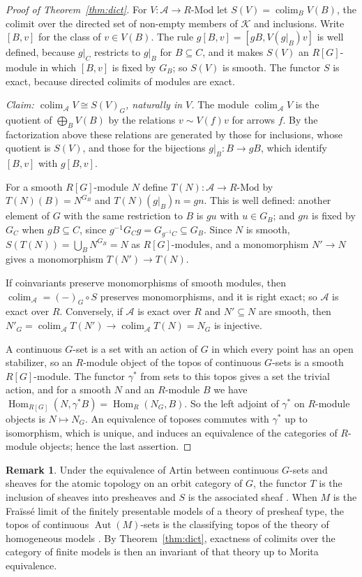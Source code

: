 \documentclass[11pt,a4paper]{article}
\theoremstyle{definition}
\newtheorem{remark}[theorem]{Remark}
\newcommand{\A}{\mathcal{A}}
\newcommand{\K}{\mathcal{K}}
\newcommand{\colim}{\operatorname{colim}}
\newcommand{\Aut}{\operatorname{Aut}}
\newcommand{\Hom}{\operatorname{Hom}}
\begin{document}
\begin{proof}[Proof of Theorem~\ref{thm:dict}]
For $V\colon\A\to R\text{-Mod}$ let $S(V)=\colim_{B}V(B)$, the colimit over
the directed set of non-empty members of $\K$ and inclusions. Write $[B,v]$
for the class of $v\in V(B)$. The rule $g[B,v]=[gB,V(g|_B)v]$ is well defined,
because $g|_C$ restricts to $g|_B$ for $B\subseteq C$, and it makes $S(V)$ an
$R[G]$-module in which $[B,v]$ is fixed by $G_B$; so $S(V)$ is smooth. The
functor $S$ is exact, because directed colimits of modules are exact.

\emph{Claim: $\colim_{\A}V\cong S(V)_G$, naturally in $V$.} The module
$\colim_{\A}V$ is the quotient of $\bigoplus_BV(B)$ by the relations
$v\sim V(f)v$ for arrows $f$. By the factorization above these relations are
generated by those for inclusions, whose quotient is $S(V)$, and those for
the bijections $g|_B\colon B\to gB$, which identify $[B,v]$ with $g[B,v]$.

For a smooth $R[G]$-module $N$ define $T(N)\colon\A\to R\text{-Mod}$ by
$T(N)(B)=N^{G_B}$ and $T(N)(g|_B)n=gn$. This is well defined: another
element of $G$ with the same restriction to $B$ is $gu$ with $u\in G_B$; and
$gn$ is fixed by $G_C$ when $gB\subseteq C$, since
$g^{-1}G_Cg=G_{g^{-1}C}\subseteq G_B$. Since $N$ is smooth,
$S(T(N))=\bigcup_BN^{G_B}=N$ as $R[G]$-modules, and a monomorphism
$N'\to N$ gives a monomorphism $T(N')\to T(N)$.

If coinvariants preserve monomorphisms of smooth modules, then
$\colim_{\A}=(-)_G\circ S$ preserves monomorphisms, and it is right exact;
so $\A$ is exact over $R$. Conversely, if $\A$ is exact over $R$ and
$N'\subseteq N$ are smooth, then
$N'_G=\colim_{\A}T(N')\to\colim_{\A}T(N)=N_G$ is injective.

A continuous $G$-set is a set with an action of $G$ in which every point
has an open stabilizer, so an $R$-module object of the topos of continuous
$G$-sets is a smooth $R[G]$-module. The functor $\gamma^*$ from sets to this
topos gives a set the trivial action, and for a smooth $N$ and an
$R$-module $B$ we have $\Hom_{R[G]}(N,\gamma^*B)=\Hom_R(N_G,B)$. So the left
adjoint of $\gamma^*$ on $R$-module objects is $N\mapsto N_G$. An equivalence
of toposes commutes with $\gamma^*$ up to isomorphism, which is unique, and
induces an equivalence of the categories of $R$-module objects; hence the
last assertion.
\end{proof}

\begin{remark}\label{rem:topos}
Under the equivalence of Artin between continuous $G$-sets and sheaves for
the atomic topology on an orbit category of $G$, the functor $T$ is the
inclusion of sheaves into presheaves and $S$ is the associated sheaf
\cite[Theorem~5.1 and the equivalence displayed after it]{DLLX}. When $M$ is
the Fra\"iss\'e limit of the finitely presentable models of a theory of
presheaf type, the topos of continuous $\Aut(M)$-sets is the classifying
topos of the theory of homogeneous models
\cite[Theorem~2.9, Proposition~2.10]{Ca}. By Theorem~\ref{thm:dict},
exactness of colimits over the category of finite models is then an
invariant of that theory up to Morita equivalence.
\end{remark}
\end{document}
